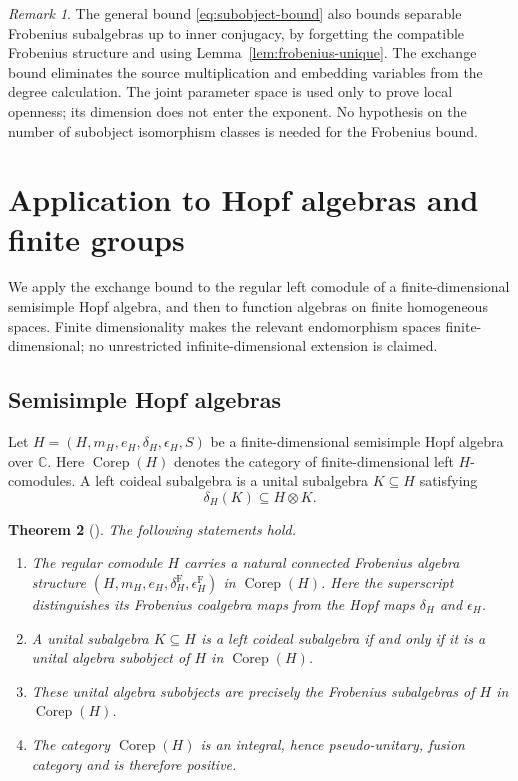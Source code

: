\documentclass[11pt]{amsart}
\newtheorem{theorem}{Theorem}[section]
\theoremstyle{definition}
\theoremstyle{remark}
\newtheorem{remark}[theorem]{Remark}
\newcommand{\CC}{\mathbb C}
\DeclareMathOperator{\Corep}{Corep}
\begin{document}
\begin{remark}
The general bound \eqref{eq:subobject-bound} also bounds separable
Frobenius subalgebras up to inner conjugacy, by forgetting the compatible
Frobenius structure and using Lemma~\ref{lem:frobenius-unique}.
The exchange bound eliminates the source multiplication and embedding
variables from the degree calculation.  The joint parameter space is
used only to prove local openness; its dimension does not enter the
exponent.  No hypothesis on the number of subobject isomorphism classes
is needed for the Frobenius bound.
\end{remark}
\section{Application to Hopf algebras and finite groups}\label{sec:hopf}

We apply the exchange bound to the regular left comodule of a
finite-dimensional semisimple Hopf algebra, and then to function algebras
on finite homogeneous spaces.  Finite dimensionality makes the relevant
endomorphism spaces finite-dimensional; no unrestricted infinite-dimensional
extension is claimed.

\subsection{Semisimple Hopf algebras}

Let $H=(H,m_H,e_H,\delta_H,\epsilon_H,S)$ be a finite-dimensional
semisimple Hopf algebra over $\CC$.  Here $\Corep(H)$ denotes the
category of finite-dimensional left $H$-comodules.  A left coideal
subalgebra is a unital
subalgebra $K\subseteq H$ satisfying
\[
 \delta_H(K)\subseteq H\otimes K.
\]

\begin{theorem}[{\cite[Theorem~11.11, Proposition~6.5, and the proof of
Corollary~11.24]{GhoshPalcouxLattices}}]
\label{thm:ghosh-palcoux-hopf}
The following statements hold.
\begin{enumerate}[label=\textup{(\roman*)}]
  \item The regular comodule $H$ carries a natural connected Frobenius
  algebra structure
  $(H,m_H,e_H,\delta_H^{\mathrm F},\epsilon_H^{\mathrm F})$ in
  $\Corep(H)$.  Here the superscript distinguishes its Frobenius coalgebra
  maps from the Hopf maps $\delta_H$ and $\epsilon_H$.
  \item A unital subalgebra $K\subseteq H$ is a left coideal subalgebra if
  and only if it is a unital algebra subobject of $H$ in $\Corep(H)$.
  \item These unital algebra subobjects are precisely the Frobenius
  subalgebras of $H$ in $\Corep(H)$.
  \item The category $\Corep(H)$ is an integral, hence pseudo-unitary,
  fusion category and is therefore positive.
\end{enumerate}
\end{theorem}
\end{document}
